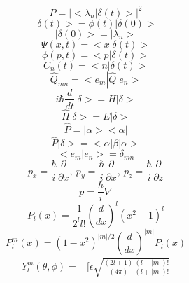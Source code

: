 \documentclass[10pt]{article}
\begin{document}
\begin{multicols}{3}
\begin{equation*}
P=|<\lambda_n|\delta(t)>|^2
\end{equation*}
\begin{equation*}
|\delta(t)>=\phi(t)|\delta(0)>
\end{equation*}
\begin{equation*}
|\delta(0)>=|\lambda_n>
\end{equation*}
\begin{equation*}
\Psi(x,t)=<x|\delta(t)>
\end{equation*}
\begin{equation*}
\phi(p,t)=<p|\delta(t)>
\end{equation*}
\begin{equation*}
C_n(t)=<n|\delta(t)>
\end{equation*}
\begin{equation*}
\hat{Q}_{mn}=<e_m|\hat{Q}|e_n>
\end{equation*}
\begin{equation*}
i\hbar\frac{d}{dt}|\delta>=H|\delta>
\end{equation*}
\begin{equation*}
\hat{H}|\delta>=E|\delta>
\end{equation*}
\begin{equation*}
\hat{P}=|\alpha><\alpha|
\end{equation*}
\begin{equation*}
\hat{P}|\delta>=<\alpha|\beta|\alpha>
\end{equation*}
\begin{equation*}
<e_m|e_n>=\delta_{mn}
\end{equation*}
\begin{equation*}
p_x=\frac{\hbar}{i}\frac{\partial}{\partial x} ,\ p_y=\frac{\hbar}{i}\frac{\partial}{\partial x} ,\ p_z=\frac{\hbar}{i}\frac{\partial}{\partial z}
\end{equation*}
\begin{equation*}
p=\frac{\hbar}{i}\nabla
\end{equation*}
\begin{equation*}
P_{l}(x)=\frac{1}{2^ll!}\left(\frac{d}{dx}\right)^l(x^2-1)^l
\end{equation*}
\begin{equation*}
P_{l}^{m}(x)=(1-x^2)^{|m|/2}\left(\frac{d}{dx}\right)^{|m|}P_{l}(x)
\end{equation*}
\begin{equation*}
\begin{split}
Y_{l}^{m}(\theta,\phi)=&\Bigg[\epsilon\sqrt{\frac{(2l+1)}{(4\pi)}\frac{(l-|m|)!}{(l+|m|)!}} \\

\end{split}
\end{equation*}
\end{multicols}
\end{document}
